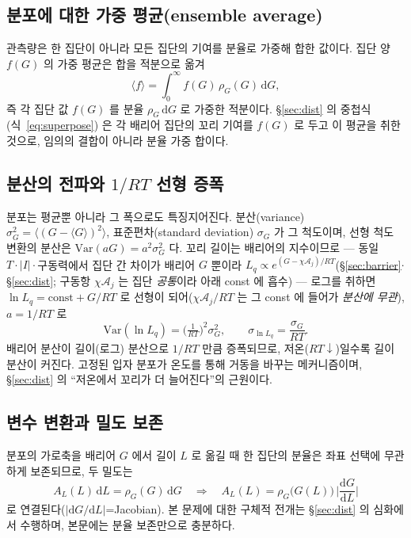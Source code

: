 \documentclass[11pt,a4paper]{article}
\newcommand{\dd}{\mathrm{d}}
\begin{document}
\subsection{분포에 대한 가중 평균(ensemble average)}
관측량은 한 집단이 아니라 모든 집단의 기여를 분율로 가중해 합한 값이다. 집단 양 $f(G)$ 의 가중 평균은 합을
적분으로 옮겨
\begin{equation}
\langle f\rangle=\int_0^\infty f(G)\,\rho_G(G)\,\dd G,
\label{eq:wavg}
\end{equation}
즉 각 집단 값 $f(G)$ 를 분율 $\rho_G\,\dd G$ 로 가중한 적분이다. \S\ref{sec:dist} 의 중첩식(식~\eqref{eq:superpose})
은 각 배리어 집단의 꼬리 기여를 $f(G)$ 로 두고 이 평균을 취한 것으로, 임의의 결합이 아니라 분율 가중 합이다.

\subsection{분산의 전파와 $1/RT$ 선형 증폭}
분포는 평균뿐 아니라 그 폭으로도 특징지어진다. 분산(variance) $\sigma_G^2=\langle(G-\langle G\rangle)^2\rangle$,
표준편차(standard deviation) $\sigma_G$ 가 그 척도이며, 선형 척도 변환의 분산은 $\mathrm{Var}(aG)=a^2\sigma_G^2$ 다.
꼬리 길이는 배리어의 지수이므로 — 동일 $T\cdot|I|\cdot$구동력에서 집단 간 차이가 배리어 $G$ 뿐이라
$L_q\propto e^{(G-\chi\mathcal A_j)/RT}$(\S\ref{sec:barrier}$\cdot$\S\ref{sec:dist}; 구동항 $\chi\mathcal A_j$ 는 집단
\emph{공통}이라 아래 const 에 흡수) — 로그를 취하면 $\ln L_q=\text{const}+G/RT$ 로 선형이 되어($\chi\mathcal A_j/RT$
는 그 const 에 들어가 \emph{분산에 무관}), $a=1/RT$ 로
\begin{equation}
\mathrm{Var}(\ln L_q)=\Big(\tfrac{1}{RT}\Big)^2\sigma_G^2,\qquad \sigma_{\ln L_q}=\frac{\sigma_G}{RT}.
\label{eq:varprop}
\end{equation}
배리어 분산이 길이(로그) 분산으로 $1/RT$ 만큼 증폭되므로, 저온($RT\downarrow$)일수록 길이 분산이 커진다. 고정된
입자 분포가 온도를 통해 거동을 바꾸는 메커니즘이며, \S\ref{sec:dist} 의 ``저온에서 꼬리가 더 늘어진다''의 근원이다.

\subsection{변수 변환과 밀도 보존}
분포의 가로축을 배리어 $G$ 에서 길이 $L$ 로 옮길 때 한 집단의 분율은 좌표 선택에 무관하게 보존되므로, 두 밀도는
\begin{equation}
A_L(L)\,\dd L=\rho_G(G)\,\dd G\quad\Longrightarrow\quad A_L(L)=\rho_G\big(G(L)\big)\,\Big|\frac{\dd G}{\dd L}\Big|
\label{eq:jacobian}
\end{equation}
로 연결된다($|\dd G/\dd L|$=Jacobian). 본 문제에 대한 구체적 전개는 \S\ref{sec:dist} 의 심화에서 수행하며,
본문에는 분율 보존만으로 충분하다.
\end{document}
